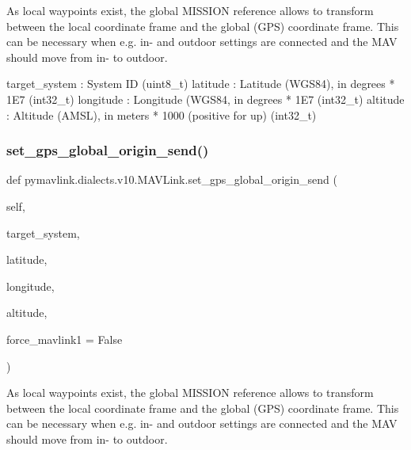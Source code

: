 \begin{DoxyVerb}
\begin{DoxyVerb}
\begin{DoxyVerb}
\begin{DoxyVerb}
\begin{DoxyVerb}
\begin{DoxyVerb}
\begin{DoxyVerb}
\begin{DoxyVerb}
\begin{DoxyVerb}
\begin{DoxyVerb}
\begin{DoxyVerb}As local waypoints exist, the global MISSION reference allows to
transform between the local coordinate frame and the
global (GPS) coordinate frame. This can be necessary
when e.g. in- and outdoor settings are connected and
the MAV should move from in- to outdoor.

target_system             : System ID (uint8_t)
latitude                  : Latitude (WGS84), in degrees * 1E7 (int32_t)
longitude                 : Longitude (WGS84, in degrees * 1E7 (int32_t)
altitude                  : Altitude (AMSL), in meters * 1000 (positive for up) (int32_t)\end{DoxyVerb}
 \mbox{\label{classpymavlink_1_1dialects_1_1v10_1_1MAVLink_a4b849b41fd5d1a7b0a194a93832071ba}} 
\subsubsection{\texorpdfstring{set\+\_\+gps\+\_\+global\+\_\+origin\+\_\+send()}{set\_gps\_global\_origin\_send()}}
{\footnotesize\ttfamily def pymavlink.\+dialects.\+v10.\+M\+A\+V\+Link.\+set\+\_\+gps\+\_\+global\+\_\+origin\+\_\+send (\begin{DoxyParamCaption}\item[{}]{self,  }\item[{}]{target\+\_\+system,  }\item[{}]{latitude,  }\item[{}]{longitude,  }\item[{}]{altitude,  }\item[{}]{force\+\_\+mavlink1 = {\ttfamily False} }\end{DoxyParamCaption})}

\begin{DoxyVerb}As local waypoints exist, the global MISSION reference allows to
transform between the local coordinate frame and the
global (GPS) coordinate frame. This can be necessary
when e.g. in- and outdoor settings are connected and
the MAV should move from in- to outdoor.


\end{DoxyVerb}
\end{DoxyVerb}
\end{DoxyVerb}
\end{DoxyVerb}
\end{DoxyVerb}
\end{DoxyVerb}
\end{DoxyVerb}
\end{DoxyVerb}
\end{DoxyVerb}
\end{DoxyVerb}
\end{DoxyVerb}
